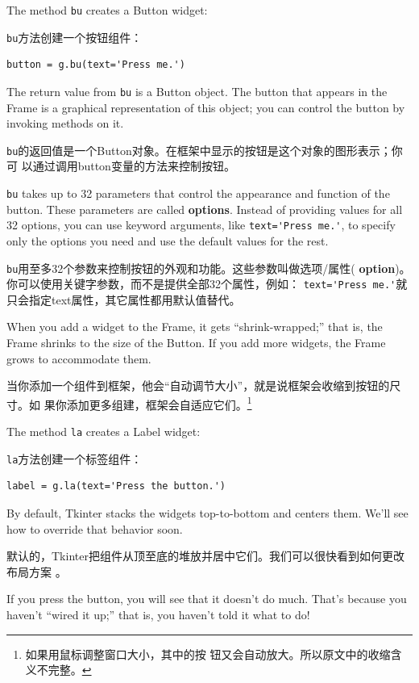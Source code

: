 \documentclass[10pt]{book}
\begin{document}
\begin{CJK}{UTF8}{gbsn}
The method {\tt bu} creates a Button widget:

{\tt bu}方法创建一个按钮组件：

\begin{verbatim}
button = g.bu(text='Press me.')
\end{verbatim}
%
The return value from {\tt bu} is a Button object.  The button
that appears in the Frame is a graphical representation of this
object; you can control the button by invoking methods on it.

{\tt bu}的返回值是一个Button对象。在框架中显示的按钮是这个对象的图形表示；你可
以通过调用button变量的方法来控制按钮。

{\tt bu} takes up to 32 parameters that control the appearance
and function of the button.  These parameters are called
{\bf options}.  Instead of providing values for all 32 options,
you can use keyword arguments, like \verb"text='Press me.'",
to specify only the options you need and use the default
values for the rest.

{\tt bu}用至多32个参数来控制按钮的外观和功能。这些参数叫做选项/属性({\bf
option})。你可以使用关键字参数，而不是提供全部32个属性，例如：
\verb"text='Press me.'"就只会指定text属性，其它属性都用默认值替代。

When you add a widget to the Frame, it gets ``shrink-wrapped;''
that is, the Frame shrinks to the size of the Button.  If you
add more widgets, the Frame grows to accommodate them.

当你添加一个组件到框架，他会``自动调节大小''，就是说框架会收缩到按钮的尺寸。如
果你添加更多组建，框架会自适应它们。\footnote{如果用鼠标调整窗口大小，其中的按
钮又会自动放大。所以原文中的收缩含义不完整。}

The method {\tt la} creates a Label widget:

{\tt la}方法创建一个标签组件：

\begin{verbatim}
label = g.la(text='Press the button.')
\end{verbatim}
%
By default, Tkinter stacks the widgets top-to-bottom and centers
them.  We'll see how to override that behavior soon.

默认的，Tkinter把组件从顶至底的堆放并居中它们。我们可以很快看到如何更改布局方案
。

If you press the button, you will see that it doesn't do much.
That's because you haven't ``wired it up;'' that is, you haven't
told it what to do!


\end{CJK}
\end{document}
